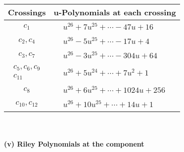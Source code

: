 \documentclass[1p]{elsarticle_modified}
\theoremstyle{definition}
\begin{document}
\begin{tabular}{m{50pt}|m{274pt}}
Crossings & \hspace{64pt}u-Polynomials at each crossing \\
\hline $$\begin{aligned}c_{1}\end{aligned}$$&$\begin{aligned}
&u^{26}+7 u^{25}+\cdots-47 u+16
\end{aligned}$\\
\hline $$\begin{aligned}c_{2},c_{4}\end{aligned}$$&$\begin{aligned}
&u^{26}-5 u^{25}+\cdots-17 u+4
\end{aligned}$\\
\hline $$\begin{aligned}c_{3},c_{7}\end{aligned}$$&$\begin{aligned}
&u^{26}-3 u^{25}+\cdots-304 u+64
\end{aligned}$\\
\hline $$\begin{aligned}c_{5},c_{6},c_{9}\\c_{11}\end{aligned}$$&$\begin{aligned}
&u^{26}+5 u^{24}+\cdots+7 u^2+1
\end{aligned}$\\
\hline $$\begin{aligned}c_{8}\end{aligned}$$&$\begin{aligned}
&u^{26}+6 u^{25}+\cdots+1024 u+256
\end{aligned}$\\
\hline $$\begin{aligned}c_{10},c_{12}\end{aligned}$$&$\begin{aligned}
&u^{26}+10 u^{25}+\cdots+14 u+1
\end{aligned}$\\
\hline
\end{tabular}\\~\\
\newpage\renewcommand{\arraystretch}{1}
\flushleft \textbf{(v) Riley Polynomials at the component}\newline \\
\end{document}
